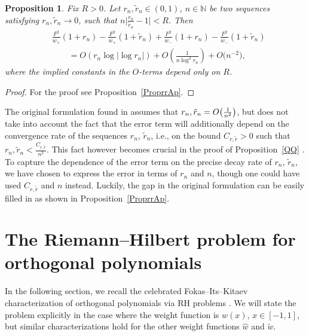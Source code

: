 \documentclass[11pt]{article}
\numberwithin{equation}{section}
\newcommand{\N}{\mathbb{N}}
\newcommand{\hw}{\widehat w}
\newcommand{\tw}{\widetilde w}
\newtheorem{Proposition}[Theorem]{Proposition}
 { \theoremstyle{definition}
\newtheorem{Definition}[Theorem]{Definition}
\newtheorem{Note}[Theorem]{Note}
\newtheorem{Example}[Theorem]{Example}
\newtheorem{Remark}[Theorem]{Remark} }
\numberwithin{equation}{section}
\begin{document}
\begin{Proposition} \label{Proprr}
Fix $R > 0$. Let $r_n, \tilde r_n \in (0, 1)$, $n \in \N$ be two sequences satisfying $r_n, \tilde r_n \to 0$, such that $n\big|\frac{r_n}{\tilde r_n}-1|< R$. Then
\begin{align*}\nonumber
 &\frac{F^2}{w_+}(1+r_n)-\frac{F^2}{w_+}(1+\tilde r_n)+\frac{F^2}{w_-}(1+r_n)-\frac{F^2}{w_-}(1+\tilde r_n)
 \\
 &\qquad= O(r_n \log |\log r_n |) + O\left(\frac{1}{n\log^3 r_n}\right) + O\big(n^{-2}\big),
\end{align*}
where the implied constants in the $O$-terms depend only on $R$.
\end{Proposition}
\begin{proof}
For the proof see Proposition~\ref{ProprrAp}.
\end{proof}
\begin{Remark}
The original formulation found in \cite[Proposition~A.4]{CD} assumes that $r_n, \tilde r_n = \smash{O\big(\frac{1}{n^2}\big)}$, but does not take into account the fact that the error term will additionally depend on the convergence rate of the sequences $r_n$, $\tilde r_n$, i.e., on the bound $C_{r, \tilde r} > 0$ such that $r_n, \tilde r_n < \frac{C_{r,\tilde r}}{n^2}$. This fact however becomes crucial in the proof of Proposition~\ref{QQ} \cite[Proposition~C.4]{CD}. To capture the dependence of the error term on the precise decay rate of $r_n$, $\tilde r_n$, we have chosen to express the error in terms of $r_n$ and $n$, though one could have used $C_{r,\tilde r}$ and $n$ instead. Luckily, the gap in the original formulation can be easily filled in as shown in Proposition~\ref{ProprrAp}.
\end{Remark}

\section{The Riemann--Hilbert problem for orthogonal polynomials}\label{RHProblems}

In the following section, we recall the celebrated Fokas--Its--Kitaev characterization of orthogonal polynomials via RH problems \cite{FIK}. We will state the problem explicitly in the case where the weight function is $w(x)$, $x\in[-1,1]$, but similar characterizations hold for the other weight functions $\hw$ and $\tw$.
\end{document}
